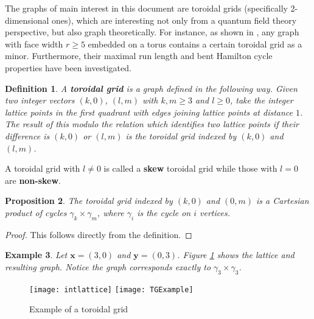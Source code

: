 \documentclass[12pt]{amsart}
\newtheorem{definition}{Definition}
\newtheorem{proposition}[definition]{Proposition}
\newtheorem{example}[definition]{Example}
\numberwithin{definition}{section}
\begin{document}
The graphs of main interest in this document are toroidal grids (specifically 2-dimensional ones), which are interesting not only from a quantum field theory perspective, but also graph theoretically. For instance, as shown in \cite{DeGraafShrijver1994}, any graph with face width $r\geq5$ embedded on a torus contains a certain toroidal grid as a minor. Furthermore, their maximal run length \cite{Doig2004} and bent Hamilton cycle properties \cite{RuskeySawada2003} have been investigated.
\begin{definition}
  A \textbf{toroidal grid} is a graph defined in the following way.  Given two integer vectors $(k,0)$, $(l,m)$ with $k, m \geq 3$ and $l\geq 0$, take the integer lattice points in the first quadrant with edges joining lattice points at distance $1$.  The result of this modulo the relation which identifies two lattice points if their difference is $(k, 0)$ or $(l, m)$ is the toroidal grid indexed by $(k, 0)$ and $(l, m)$.
\end{definition}

A toroidal grid with $l \neq 0$ is called a \textbf{skew} toroidal grid while those with $l = 0$ are \textbf{non-skew}.

\begin{proposition}
	The toroidal grid indexed by $(k, 0)$ and $(0, m)$ is a Cartesian product of cycles $\gamma_k \times \gamma_m$, where $\gamma_i$ is the cycle on $i$ vertices.  
\end{proposition}

\begin{proof}
This follows directly from the definition.
\end{proof}


\begin{example}
	Let $\mathbf{x}=(3,0)$ and $\mathbf{y}=(0,3)$. Figure \ref{fig eg} shows the lattice and resulting graph. Notice the graph corresponds exactly to $\gamma_3\times \gamma_3$. \\
\end{example}

	\begin{figure}[h]
	\texttt{[image: intlattice]}
	\texttt{[image: TGExample]} 
	\caption{Example of a toroidal grid}\label{fig eg}
	\end{figure}
	
\end{document}
